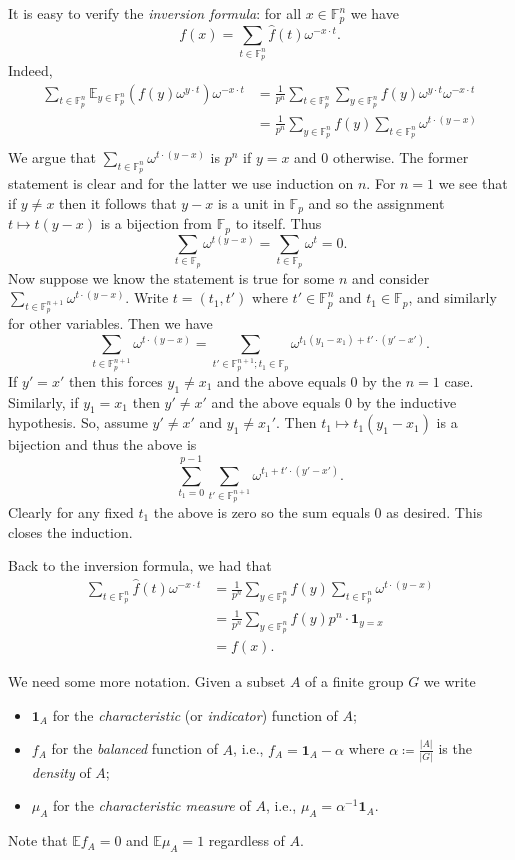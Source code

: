 \documentclass{report}
\theoremstyle{definition}
\theoremstyle{plain}
\theoremstyle{definition}
\begin{document}
	It is easy to verify the \emph{inversion formula}: for all $x\in \mathbb{F}_p^n$ we have
	\[
		f(x) = \sum_{t\in \mathbb{F}_p^n}\hat{f}(t)\omega^{-x\cdot t}.
	\]
	Indeed,
	\begin{align*}
		\sum_{t\in \mathbb{F}^n_p}\mathbb{E}_{y\in \mathbb{F}^n_p}(f(y)\omega^{y\cdot t})\omega^{-x\cdot t}&= \frac{1}{p^n}\sum_{t\in \mathbb{F}^n_p}\sum_{y\in\mathbb{F}^n_p}f(y)\omega^{y\cdot t}\omega^{-x\cdot t}\\
		&= \frac{1}{p^n}\sum_{y\in\mathbb{F}^n_p}f(y)\sum_{t\in \mathbb{F}^n_p}\omega^{t\cdot (y-x)}\\
	\end{align*}
	We argue that $\sum_{t\in \mathbb{F}^n_p}\omega^{t\cdot (y-x)}$ is $p^n$ if $y = x$ and $0$ otherwise. The former statement is clear and for the latter we use induction on $n$. For $n = 1$ we see that if $y\neq x$ then it follows that $y-x$ is a unit in $\mathbb{F}_p$ and so the assignment $t\mapsto t(y-x)$ is a bijection from $\mathbb{F}_p$ to itself. Thus
	\[\sum_{t\in \mathbb{F}_p}\omega^{t (y-x)} = \sum_{t\in \mathbb{F}_p} \omega^{t} = 0.\]
	Now suppose we know the statement is true for some $n$ and consider $\sum_{t\in \mathbb{F}^{n+1}_p}\omega^{t\cdot (y-x)}$. Write $t= (t_{1},t')$ where $t'\in \mathbb{F}_{p}^n$ and $t_1\in \mathbb{F}_p$, and similarly for other variables. Then we have 
	\[
		\sum_{t\in \mathbb{F}^{n+1}_p}\omega^{t\cdot (y-x)} = \sum_{t'\in \mathbb{F}^{n+1}_p;t_1\in\mathbb{F}_p}\omega^{t_1(y_1-x_1)+ t'\cdot (y'-x')}.
	\]
	If $y' = x'$ then this forces $y_1\neq x_1$ and the above equals 0 by the $n=1$ case. Similarly, if $y_1 = x_1$ then $y' \neq x'$ and the above equals 0 by the inductive hypothesis. So, assume $y'\neq x'$ and $y_1\neq x_1'$. Then $t_1\mapsto t_1(y_1-x_1)$ is a bijection and thus the above is
	\[
		\sum_{t_1 = 0}^{p-1}\sum_{t'\in \mathbb{F}^{n+1}_p}\omega^{t_1+ t'\cdot (y'-x')}.
	\]
	Clearly for any fixed $t_1$ the above is zero so the sum equals 0 as desired. This closes the induction.
	
	Back to the inversion formula, we had that
	\begin{align*}
		\sum_{t\in \mathbb{F}_p^n}\hat{f}(t)\omega^{-x\cdot t} &= \frac{1}{p^n}\sum_{y\in\mathbb{F}_p^n}f(y)\sum_{t\in\mathbb{F}_p^n}\omega^{t\cdot (y-x)}\\
		&=\frac{1}{p^n}\sum_{y\in\mathbb{F}_p^n}f(y)p^n\cdot \mathbf{1}_{y=x}\\
		&= f(x).
	\end{align*}
	
	We need some more notation.  Given a subset $A$ of a finite group $G$ we write
	\begin{itemize}
		\item $\mathbf{1}_A$ for the \emph{characteristic} (or \emph{indicator}) function of $A$;
		\item $f_A$ for the \emph{balanced} function of $A$, i.e., $f_A = \mathbf{1}_A - \alpha$ where $\alpha \coloneqq \frac{|A|}{|G|}$ is the \emph{density} of $A$;
		\item $\mu_A$ for the \emph{characteristic measure} of $A$, i.e., $\mu_A = \alpha^{-1}\mathbf{1}_A$.
	\end{itemize}
	Note that $\mathbb{E}f_A = 0$ and $\mathbb{E}\mu_A = 1$ regardless of $A$.
	
\end{document}
